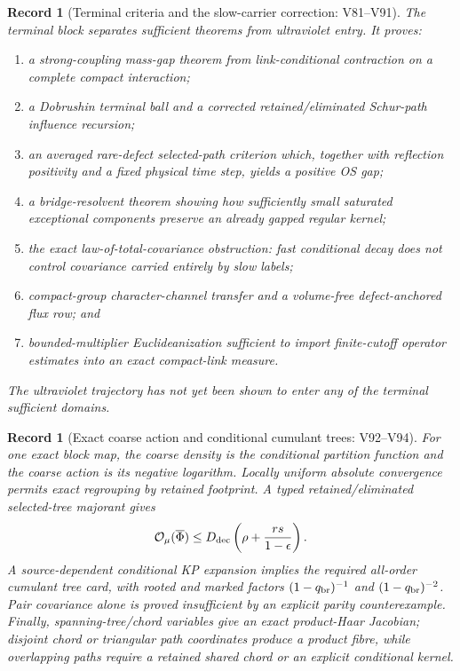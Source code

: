 \documentclass[11pt,oneside]{book}
\newtheorem{record}[theorem]{Record}
\theoremstyle{definition}
\theoremstyle{remark}
\begin{document}
\begin{record}[Terminal criteria and the slow-carrier correction:
V81--V91]
\label{rec:e8v1-v81-v91}
The terminal block separates sufficient theorems from ultraviolet
entry.  It proves:
\begin{enumerate}[label=\textup{(\roman*)},leftmargin=3.5em]
\item a strong-coupling mass-gap theorem from link-conditional
      contraction on a complete compact interaction;
\item a Dobrushin terminal ball and a corrected retained/eliminated
      Schur-path influence recursion;
\item an averaged rare-defect selected-path criterion which, together
      with reflection positivity and a fixed physical time step,
      yields a positive OS gap;
\item a bridge-resolvent theorem showing how sufficiently small
      saturated exceptional components preserve an already gapped
      regular kernel;
\item the exact law-of-total-covariance obstruction: fast conditional
      decay does not control covariance carried entirely by slow
      labels;
\item compact-group character-channel transfer and a volume-free
      defect-anchored flux row; and
\item bounded-multiplier Euclideanization sufficient to import
      finite-cutoff operator estimates into an exact compact-link
      measure.
\end{enumerate}
The ultraviolet trajectory has not yet been shown to enter any of the
terminal sufficient domains.
\end{record}

\begin{record}[Exact coarse action and conditional cumulant trees:
V92--V94]
\label{rec:e8v1-v92-v94}
For one exact block map, the coarse density is the conditional
partition function and the coarse action is its negative logarithm.
Locally uniform absolute convergence permits exact regrouping by
retained footprint.  A typed retained/eliminated selected-tree
majorant gives
\[
 {\cal O}_\mu(\overline\Phi)
 \leq
 D_{\rm dec}
 \left(\rho+\frac{rs}{1-\epsilon}\right).            \label{eq:e8v1-coarse-recursion}
\]
A source-dependent conditional KP expansion implies the required
all-order cumulant tree card, with rooted and marked factors
\((1-q_{\rm br})^{-1}\) and \((1-q_{\rm br})^{-2}\).
Pair covariance alone is proved insufficient by an explicit parity
counterexample.  Finally, spanning-tree/chord variables give an exact
product-Haar Jacobian; disjoint chord or triangular path coordinates
produce a product fibre, while overlapping paths require a retained
shared chord or an explicit conditional kernel.
\end{record}
\end{document}
